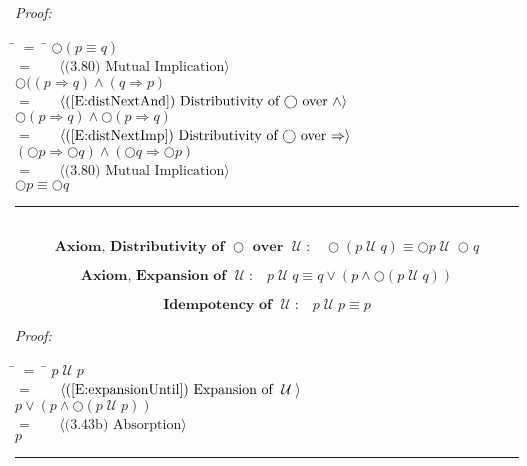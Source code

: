 \documentclass[fleqn, leqno]{article}
\newcommand{\lgap}{2pt}                             %
\newcommand{\mymathindent}{24pt}                      %
\newcommand{\until}{\;\mathcal{U}\;}
\newcommand{\next}{\bigcirc}
\newcommand{\myqed}{\hfill\rule[-.23ex]{1.2ex}{2.0ex}}
\newcommand{\Gll} {\langle}                         %
\newcommand{\Ggg} {\rangle}                         %
\newcommand{\Hint}[1]     {\ \ \ $\Gll              \mbox{#1} \Ggg$ }   %
\begin{document}
\emph{Proof:}
\begin{tabbing}
\hspace{\mymathindent} \= $= \;$ \= \kill
  \> \>   $\next (p \equiv q)$\\[\lgap]
  \> $=$  \>  \Hint{(3.80) Mutual Implication}\\[\lgap]
  \> \>   $\next ((p \Rightarrow q) \land (q \Rightarrow p)$\\[\lgap]
  \> $=$  \>  \Hint{(\ref{E:distNextAnd}) Distributivity of $\next$ over $\land$}\\[\lgap]
  \> \>   $\next (p \Rightarrow q) \land \next (p \Rightarrow q)$\\[\lgap]
  \> $=$  \>  \Hint{(\ref{E:distNextImp}) Distributivity of $\next$ over $\Rightarrow$}\\[\lgap]
  \> \>   $(\next p \Rightarrow \next q) \land (\next q \Rightarrow \next p)$\\[\lgap]
  \> $=$  \>  \Hint{(3.80) Mutual Implication}\\[\lgap]
  \> \>   $\next p \equiv \next q$
\end{tabbing}
\myqed\\[\lgap]


\begin{equation}\label{E:distNextUntil}
\textbf{Axiom, Distributivity of $\next$ over $\until$:}\quad \next (p \until q) \equiv \next p \until \next q
\end{equation}

\begin{equation}\label{E:expansionUntil}
\textbf{Axiom, Expansion of $\until$:}\quad p \until q \equiv q \lor (p \land \next (p \until q))
\end{equation}


\begin{equation}\label{E:idemUntil}
\textbf{Idempotency of $\until$:}\quad p \until p \equiv p
\end{equation}

\emph{Proof:}
\begin{tabbing}
\hspace{\mymathindent} \= $= \;$ \= \kill
  \> \>   $p \until p$\\[\lgap]
  \> $=$  \>  \Hint{(\ref{E:expansionUntil}) Expansion of $\until$}\\[\lgap]
  \> \>   $p \lor (p \land \next(p \until p))$\\[\lgap]
  \> $=$  \>  \Hint{(3.43b) Absorption}\\[\lgap]
  \> \>   $p$\\[\lgap]
\end{tabbing}
\myqed\\[\lgap]
\end{document}
